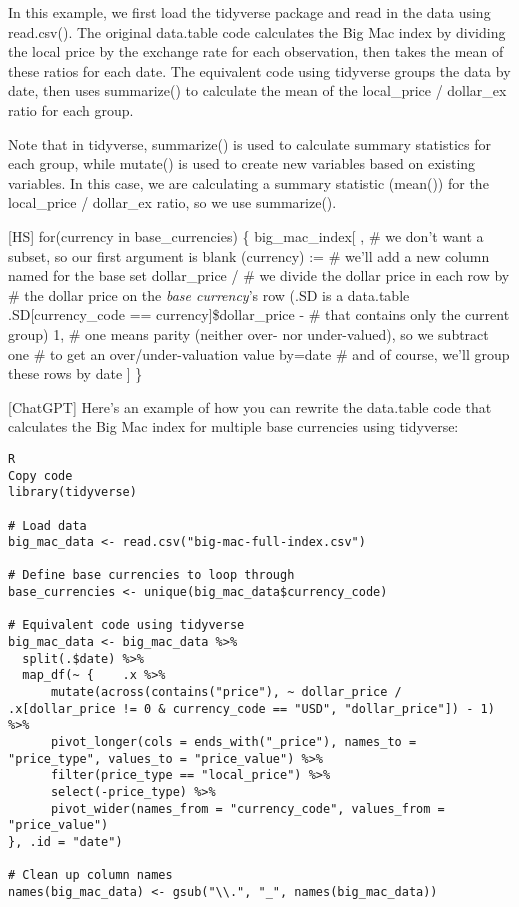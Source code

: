 \documentclass[
]{book}
\theoremstyle{definition}
\theoremstyle{definition}
\theoremstyle{definition}
\theoremstyle{definition}
\theoremstyle{remark}
\begin{document}
In this example, we first load the tidyverse package and read in the data using read.csv(). The original data.table code calculates the Big Mac index by dividing the local price by the exchange rate for each observation, then takes the mean of these ratios for each date. The equivalent code using tidyverse groups the data by date, then uses summarize() to calculate the mean of the local\_price / dollar\_ex ratio for each group.

Note that in tidyverse, summarize() is used to calculate summary statistics for each group, while mutate() is used to create new variables based on existing variables. In this case, we are calculating a summary statistic (mean()) for the local\_price / dollar\_ex ratio, so we use summarize().

{[}HS{]}
for(currency in base\_currencies) \{
big\_mac\_index{[} , \# we don't want a subset, so our first argument is blank
(currency) := \# we'll add a new column named for the base set
dollar\_price / \# we divide the dollar price in each row by
\# the dollar price on the \emph{base currency}'s row (.SD is a data.table
.SD{[}currency\_code == currency{]}\$dollar\_price - \# that contains only the current group)
1, \# one means parity (neither over- nor under-valued), so we subtract one
\# to get an over/under-valuation value
by=date \# and of course, we'll group these rows by date
{]}
\}

{[}ChatGPT{]} Here's an example of how you can rewrite the data.table code that calculates the Big Mac index for multiple base currencies using tidyverse:

\begin{verbatim}
R
Copy code
library(tidyverse)

# Load data
big_mac_data <- read.csv("big-mac-full-index.csv")

# Define base currencies to loop through
base_currencies <- unique(big_mac_data$currency_code)

# Equivalent code using tidyverse
big_mac_data <- big_mac_data %>%
  split(.$date) %>%
  map_df(~ {    .x %>%
      mutate(across(contains("price"), ~ dollar_price / .x[dollar_price != 0 & currency_code == "USD", "dollar_price"]) - 1) %>%
      pivot_longer(cols = ends_with("_price"), names_to = "price_type", values_to = "price_value") %>%
      filter(price_type == "local_price") %>%
      select(-price_type) %>%
      pivot_wider(names_from = "currency_code", values_from = "price_value")
}, .id = "date")

# Clean up column names
names(big_mac_data) <- gsub("\\.", "_", names(big_mac_data))
\end{verbatim}
\end{document}
